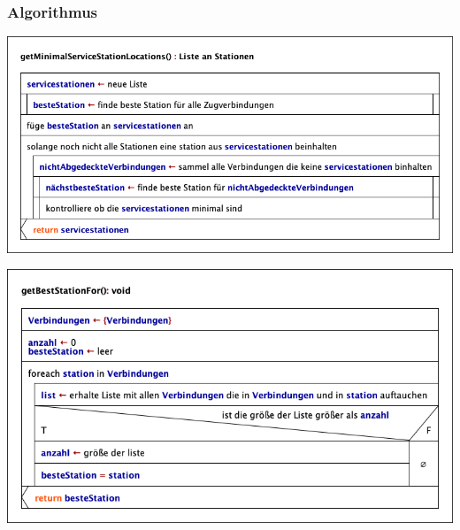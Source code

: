 \newpage
\subsubsection{Algorithmus}\label{pro:subsubsec:algorithmus}
\begin{center}
    \includegraphics[width=\linewidth]{images/Struktogramme/algorithm/getMinimalServiceStationLocations.png}
    \label{pro:subsubsecpar:berechne-minimale-anzahl-an-servicestationen}
\end{center}

\begin{center}
    \includegraphics[width=\linewidth]{images/Struktogramme/algorithm/getBestStationFor.png}
    \label{pro:subsubsecpar:berechne-minimale-anzahl-an-servicestationen}
\end{center}

